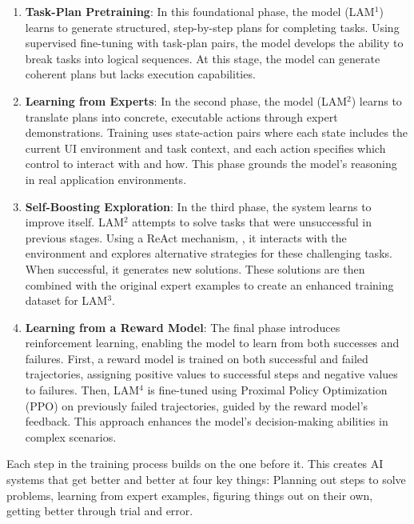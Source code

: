 \documentclass[journal,twoside,10pt]{IEEEtran}
\begin{document}
\begin{enumerate}
    \item \textbf{Task-Plan Pretraining}: In this foundational phase, the model (LAM$^1$) learns to generate structured, step-by-step plans for completing tasks. Using supervised fine-tuning with task-plan pairs, the model develops the ability to break tasks into logical sequences. At this stage, the model can generate coherent plans but lacks execution capabilities.
    
    \item \textbf{Learning from Experts}: In the second phase, the model (LAM$^2$) learns to translate plans into concrete, executable actions through expert demonstrations. Training uses state-action pairs where each state includes the current UI environment and task context, and each action specifies which control to interact with and how. This phase grounds the model's reasoning in real application environments.
    
    \item \textbf{Self-Boosting Exploration}: In the third phase, the system learns to improve itself. LAM$^2$ attempts to solve tasks that were unsuccessful in previous stages. Using a ReAct mechanism, \cite{yao2022react}, it interacts with the environment and explores alternative strategies for these challenging tasks. When successful, it generates new solutions. These solutions are then combined with the original expert examples to create an enhanced training dataset for LAM$^3$.
    
    \item \textbf{Learning from a Reward Model}: The final phase introduces reinforcement learning, enabling the model to learn from both successes and failures. First, a reward model is trained on both successful and failed trajectories, assigning positive values to successful steps and negative values to failures. Then, LAM$^4$ is fine-tuned using Proximal Policy Optimization (PPO) on previously failed trajectories, guided by the reward model's feedback. This approach enhances the model's decision-making abilities in complex scenarios.
\end{enumerate}

Each step in the training process builds on the one before it. This creates AI systems that get better and better at four key things: Planning out steps to solve problems, learning from expert examples, figuring things out on their own, getting better through trial and error.
\end{document}
